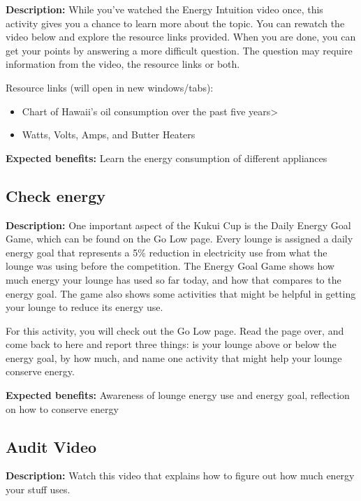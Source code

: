 \textbf{Description:} While you've watched the Energy Intuition video once, this activity gives you a chance to learn more about the topic. You can rewatch the video below and explore the resource links provided. When you are done, you can get your points by answering a more difficult question. The question may require information from the video, the resource links or both.

Resource links (will open in new windows/tabs):

\begin{itemize}
	\item Chart of Hawaii's oil consumption over the past five years>
	\item Watts, Volts, Amps, and Butter Heaters
\end{itemize}

\vspace{2ex}
\textbf{Expected benefits:} Learn the energy consumption of different appliances


\subsection{Check energy}

\textbf{Description:} One important aspect of the Kukui Cup is the Daily Energy Goal Game, which can be found on the Go Low page. Every lounge is assigned a daily energy goal that represents a 5\% reduction in electricity use from what the lounge was using before the competition. The Energy Goal Game shows how much energy your lounge has used so far today, and how that compares to the energy goal. The game also shows some activities that might be helpful in getting your lounge to reduce its energy use.

For this activity, you will check out the Go Low page. Read the page over, and come back to here and report three things: is your lounge above or below the energy goal, by how much, and name one activity that might help your lounge conserve energy.

\vspace{2ex}
\textbf{Expected benefits:} Awareness of lounge energy use and energy goal, reflection on how to conserve energy


\subsection{Audit Video}

\textbf{Description:} Watch this video that explains how to figure out how much energy your stuff uses.

